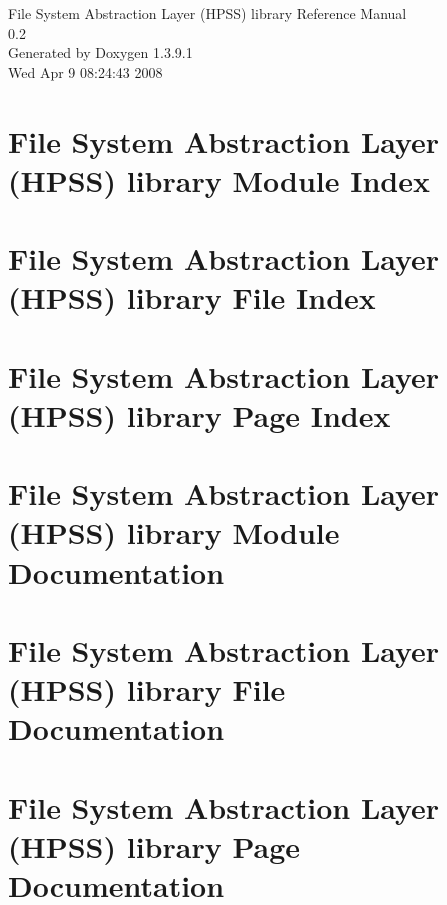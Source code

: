 \documentclass[a4paper]{book}
\begin{document}
\begin{titlepage}
\vspace*{7cm}
\begin{center}
{\Large File System Abstraction Layer (HPSS) library Reference Manual\\[1ex]\large 0.2 }\\
\vspace*{1cm}
{\large Generated by Doxygen 1.3.9.1}\\
\vspace*{0.5cm}
{\small Wed Apr 9 08:24:43 2008}\\
\end{center}
\end{titlepage}
\clearemptydoublepage
{}
\tableofcontents
\clearemptydoublepage
{}
\chapter{File System Abstraction Layer (HPSS) library Module Index}

\chapter{File System Abstraction Layer (HPSS) library File Index}

\chapter{File System Abstraction Layer (HPSS) library Page Index}

\chapter{File System Abstraction Layer (HPSS) library Module Documentation}


\chapter{File System Abstraction Layer (HPSS) library File Documentation}
























\chapter{File System Abstraction Layer (HPSS) library Page Documentation}

\printindex
\end{document}
